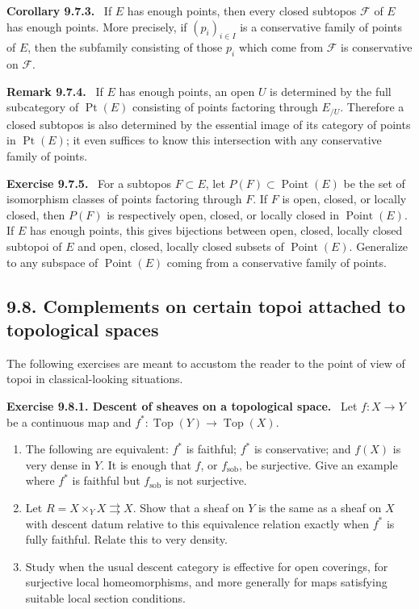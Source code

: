 \documentclass[11pt]{article}
\newcommand{\Ff}{\mathcal{F}}
\newcommand{\Top}{\operatorname{Top}}
\newcommand{\Point}{\operatorname{Point}}
\newcommand{\Ppoint}{\operatorname{Pt}}
\newcommand{\sob}{\mathrm{sob}}
\newenvironment{statement}[1]{\par\medskip\noindent\textbf{#1.}\ }{\par\medskip}
\newenvironment{remarktext}[1]{\par\medskip\noindent\textbf{#1.}\ }{\par\medskip}
\begin{document}
\begin{statement}{Corollary 9.7.3}
If \(E\) has enough points, then every closed subtopos \(\Ff\) of \(E\) has enough points. More precisely, if \((p_i)_{i\in I}\) is a conservative family of points of \(E\), then the subfamily consisting of those \(p_i\) which come from \(\Ff\) is conservative on \(\Ff\).
\end{statement}

\begin{remarktext}{Remark 9.7.4}
If \(E\) has enough points, an open \(U\) is determined by the full subcategory of \(\Ppoint(E)\) consisting of points factoring through \(E_{/U}\). Therefore a closed subtopos is also determined by the essential image of its category of points in \(\Ppoint(E)\); it even suffices to know this intersection with any conservative family of points.
\end{remarktext}

\begin{remarktext}{Exercise 9.7.5}
For a subtopos \(F\subset E\), let \(P(F)\subset\Point(E)\) be the set of isomorphism classes of points factoring through \(F\). If \(F\) is open, closed, or locally closed, then \(P(F)\) is respectively open, closed, or locally closed in \(\Point(E)\). If \(E\) has enough points, this gives bijections between open, closed, locally closed subtopoi of \(E\) and open, closed, locally closed subsets of \(\Point(E)\). Generalize to any subspace of \(\Point(E)\) coming from a conservative family of points.
\end{remarktext}

\subsection*{9.8. Complements on certain topoi attached to topological spaces}

The following exercises are meant to accustom the reader to the point of view of topoi in classical-looking situations.

\begin{remarktext}{Exercise 9.8.1. Descent of sheaves on a topological space}
Let \(f:X\to Y\) be a continuous map and \(f^*:\Top(Y)\to\Top(X)\).
\begin{enumerate}[label=\alph*)]
\item The following are equivalent: \(f^*\) is faithful; \(f^*\) is conservative; and \(f(X)\) is very dense in \(Y\). It is enough that \(f\), or \(f_{\sob}\), be surjective. Give an example where \(f^*\) is faithful but \(f_{\sob}\) is not surjective.
\item Let \(R=X\times_YX\rightrightarrows X\). Show that a sheaf on \(Y\) is the same as a sheaf on \(X\) with descent datum relative to this equivalence relation exactly when \(f^*\) is fully faithful. Relate this to very density.
\item Study when the usual descent category is effective for open coverings, for surjective local homeomorphisms, and more generally for maps satisfying suitable local section conditions.
\end{enumerate}
\end{remarktext}
\end{document}

